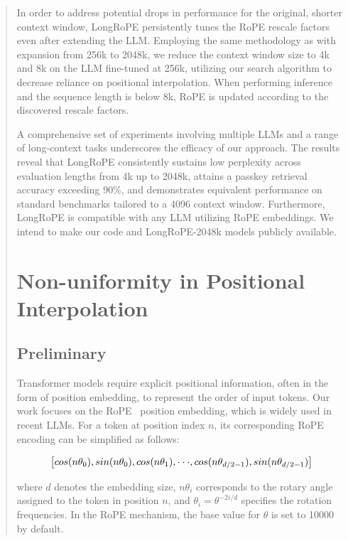 \begin{abstract}
In order to address potential drops in performance for the original, shorter context window, {LongRoPE} persistently tunes the RoPE rescale factors even after extending the LLM. Employing the same methodology as with expansion from 256k to 2048k, we reduce the context window size to 4k and 8k on the LLM fine-tuned at 256k, utilizing our search algorithm to decrease reliance on positional interpolation. When performing inference and the sequence length is below 8k, RoPE is updated according to the discovered rescale factors.

A comprehensive set of experiments involving multiple LLMs and a range of long-context tasks underscores the efficacy of our approach. The results reveal that LongRoPE consistently sustains low perplexity across evaluation lengths from 4k up to 2048k, attains a passkey retrieval accuracy exceeding 90\%, and demonstrates equivalent performance on standard benchmarks tailored to a 4096 context window. Furthermore, LongRoPE is compatible with any LLM utilizing RoPE embeddings. We intend to make our code and LongRoPE-2048k models publicly available.

\section{Non-uniformity in Positional Interpolation}
\label{sec:analysis}

\subsection{Preliminary}

Transformer models require explicit positional information, often in the form of position embedding, to represent the order of input tokens. Our work focuses on the RoPE~\cite{rope} position embedding, which is widely used in recent  LLMs. For a token at position index $n$, its corresponding RoPE encoding can be simplified as follows:

\begin{equation}
		\fontsize{7.8}{7.8} \selectfont
	\label{eq:rope}
	\left[ cos(n\theta_0), sin(n\theta_0), cos(n\theta_1), \cdot\cdot\cdot, cos(n\theta_{d/2-1}), sin(n\theta_{d/2-1}) \right]   
\end{equation}

where $d$ denotes the embedding size, 
$n\theta_i$ corresponds to the rotary angle assigned to the token in position $n$, 
and $\theta_i=\theta^{-2i/d}$ specifies the rotation frequencies. In the RoPE mechanism, the base value for $\theta$ is set to 10000 by default.


\end{abstract}
